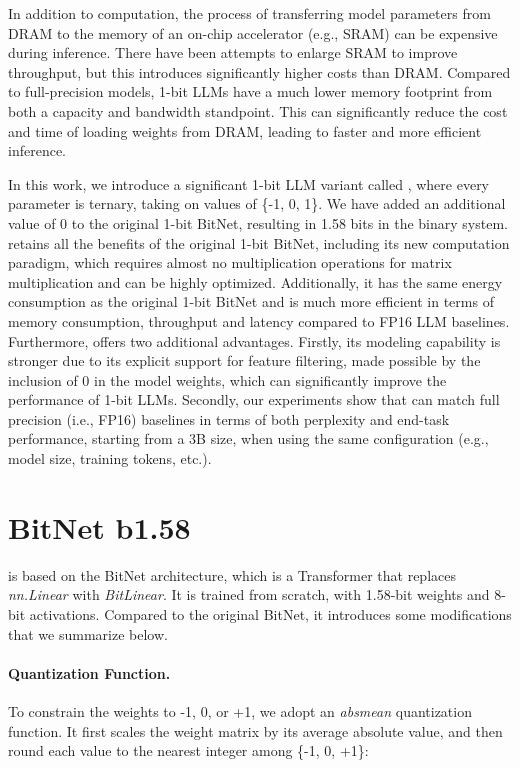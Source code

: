In addition to computation, the process of transferring model parameters from DRAM to the memory of an on-chip accelerator (e.g., SRAM) can be expensive during inference. There have been attempts to enlarge SRAM to improve throughput, but this introduces significantly higher costs than DRAM. Compared to full-precision models, 1-bit LLMs have a much lower memory footprint from both a capacity and bandwidth standpoint. This can significantly reduce the cost and time of loading weights from DRAM, leading to faster and more efficient inference.

In this work, we introduce a significant 1-bit LLM variant called \textbf{\our{}}, where every parameter is ternary, taking on values of \{-1, 0, 1\}. We have added an additional value of 0 to the original 1-bit BitNet, resulting in 1.58 bits in the binary system. \our{} retains all the benefits of the original 1-bit BitNet, including its new computation paradigm, which requires almost no multiplication operations for matrix multiplication and can be highly optimized. Additionally, it has the same energy consumption as the original 1-bit BitNet and is much more efficient in terms of memory consumption, throughput and latency compared to FP16 LLM baselines. Furthermore, \our{} offers two additional advantages. Firstly, its modeling capability is stronger due to its explicit support for feature filtering, made possible by the inclusion of 0 in the model weights, which can significantly improve the performance of 1-bit LLMs. Secondly, our experiments show that \our{} can match full precision (i.e., FP16) baselines in terms of both perplexity and end-task performance, starting from a 3B size, when using the same configuration (e.g., model size, training tokens, etc.).


\section{BitNet b1.58}

\our{} is based on the BitNet architecture, which is a Transformer that replaces \emph{nn.Linear} with \emph{BitLinear}. It is trained from scratch, with 1.58-bit weights and 8-bit activations. Compared to the original BitNet, it introduces some modifications that we summarize below.

\paragraph{Quantization Function.} To constrain the weights to -1, 0, or +1, we adopt an \emph{absmean} quantization function. It first scales the weight matrix by its average absolute value, and then round each value to the nearest integer among \{-1, 0, +1\}:

